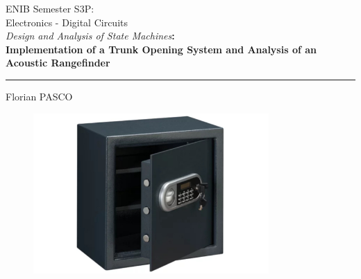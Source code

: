 \documentclass[a4paper, twoside]{article}
\begin{document}
\begin{titlepage}
\begin{center}
ENIB Semester S3P:\\
Electronics - Digital Circuits\\
\vspace{2cm}
\huge{\textsl{Design and Analysis of State Machines}\textbf{: \\
Implementation of a Trunk Opening System and Analysis of an Acoustic Rangefinder}}\\
\end{center}

\begin{center}
\rule{\linewidth}{1pt}
\end{center}

\begin{minipage}[t]{0.47\textwidth}
    {\large Florian PASCO}
\end{minipage}\hfill

\vspace{2.5cm}

\begin{figure}[H]
    \centering \includegraphics[width=0.8\textwidth]{guardpage.jpg}
\end{figure}

\vspace{0.3cm}
\end{titlepage}

\tableofcontents
\listoffigures

\newpage


\newpage

\end{document}

